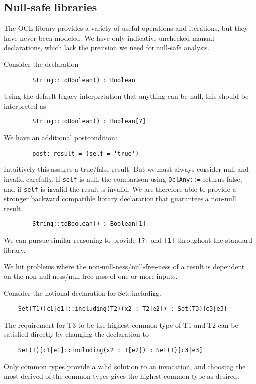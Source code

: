 \documentclass{llncs}
\begin{document}
\subsection{Null-safe libraries}

The OCL library provides a variety of useful operations and iterations, but they have never been modeled. We have only indicative unchecked manual declarations, which lack the precision we need for null-safe analysis.

Consider the declaration
\begin{verbatim}
        String::toBoolean() : Boolean
\end{verbatim}
Using the default legacy interpretation that anything can be null, this should be interpreted as
\begin{verbatim}
        String::toBoolean() : Boolean[?]
\end{verbatim}
We have an additional postcondition:
\begin{verbatim}
        post: result = (self = 'true')
\end{verbatim}

Intuitively this assures a true/false result. But we must always consider null and invalid carefully. If \verb$self$ is null, the comparison using \verb$OclAny::=$ returns false, and if \verb$self$ is invalid the result is invalid. We are therefore able to provide a stronger backward compatible library declaration that guarantees a non-null result.
\begin{verbatim}
        String::toBoolean() : Boolean[1]
\end{verbatim}

We can pursue similar reasoning to provide \verb$[?]$ and \verb$[1]$ throughout the standard library.

We hit problems where the non-null-ness/null-free-ness of a result is dependent on the non-null-ness/null-free-ness of one or more inputs.

Consider the notional declaration for Set::including.
\begin{verbatim}
    Set(T1)[c1|e1]::including(T2)(x2 : T2[e2]) : Set(T3)[c3|e3]
\end{verbatim}

The requirement for T3 to be the highest common type of T1 and T2 can be satisfied directly by changing the declaration to
\begin{verbatim}
    Set(T)[c1|e1]::including(x2 : T[e2]) : Set(T)[c3|e3]
\end{verbatim}
Only common types provide a valid solution to an invocation, and choosing the most derived of the common types gives the highest common type as desired.
\end{document}
